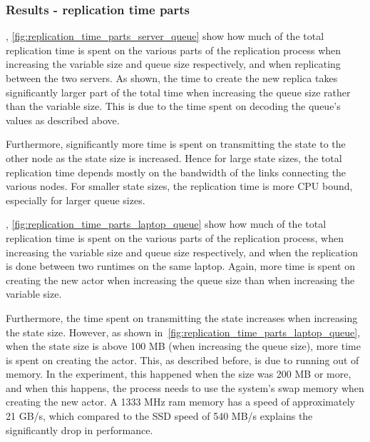 \documentclass{cslthse-msc}
\begin{document}
\subsubsection*{Results - replication time parts}
, \cref{fig:replication_time_parts_server_queue} show how much of the total replication time is spent on the various parts of the replication process when increasing the variable size and queue size respectively, and when replicating between the two servers. As shown, the time to create the new replica takes significantly larger part of the total time when increasing the queue size rather than the variable size. This is due to the time spent on decoding the queue's values as described above.

Furthermore, significantly more time is spent on transmitting the state to the other node as the state size is increased. Hence for large state sizes, the total replication time depends mostly on the bandwidth of the links connecting the various nodes. For smaller state sizes, the replication time is more CPU bound, especially for larger queue sizes.

, \cref{fig:replication_time_parts_laptop_queue} show how much of the total replication time is spent on the various parts of the replication process, when increasing the variable size and queue size respectively, and when the replication is done between two runtimes on the same laptop. Again, more time is spent on creating the new actor when increasing the queue size than when increasing the variable size.

Furthermore, the time spent on transmitting the state increases when increasing the state size. However, as shown in~\cref{fig:replication_time_parts_laptop_queue}, when the state size is above 100 MB (when increasing the queue size), more time is spent on creating the actor. This, as described before, is due to running out of memory. In the experiment, this happened when the size was 200 MB or more, and when this happens, the process needs to use the system's swap memory when creating the new actor. A 1333 MHz ram memory has a speed of approximately 21 GB/s, which compared to the SSD speed of 540 MB/s explains the significantly drop in performance.
\end{document}
